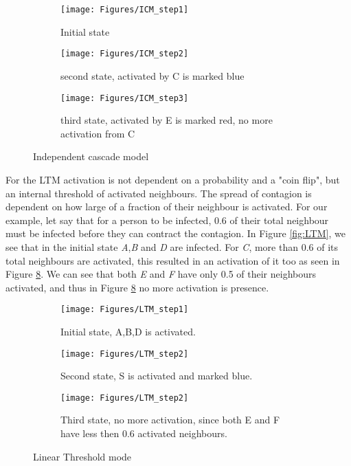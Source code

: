 
\begin{figure}[!ht]
    \begin{subfigure}{0.3\textwidth}
        \texttt{[image: Figures/ICM\_step1]}
        \caption{Initial state} 
        \label{fig:ICM1}
    \end{subfigure}
    \begin{subfigure}{0.3\textwidth}
        \texttt{[image: Figures/ICM\_step2]}
        \caption{second state, activated by C is marked blue} 
        \label{fig:ICM2}
    \end{subfigure}
    \begin{subfigure}{0.3\textwidth}
        \texttt{[image: Figures/ICM\_step3]}
        \caption{third state, activated by E is marked red, no more activation from C} 
        \label{fig:ICM3}
    \end{subfigure}
    \caption{Independent cascade model}
    \label{fig:ICM_step}
\end{figure}


For the LTM activation is not dependent on a probability and a "coin flip", but an internal threshold of activated neighbours. The spread of contagion is dependent on how large of a fraction of their neighbour is activated. For our example, let say that for a person to be infected, 0.6 of their total neighbour must be infected before they can contract the contagion. In Figure \ref{fig:LTM}, we see that in the initial state \textit{A},\textit{B} and \textit{D} are infected. For \textit{C}, more than 0.6 of its total neighbours are activated, this resulted in an activation of it too as seen in Figure \ref{fig:linearThresh3}.  We can see that both \textit{E} and \textit{F} have only 0.5 of their neighbours activated, and thus in Figure \ref{fig:linearThresh3} no more activation is presence.


\begin{figure}[!ht] \label{fig:LTM}
    \begin{subfigure}{0.3\textwidth}
        \texttt{[image: Figures/LTM\_step1]}
        \caption{Initial state, A,B,D is activated.} 
        \label{fig:linearThresh}
    \end{subfigure}
    \begin{subfigure}{0.3\textwidth}
        \texttt{[image: Figures/LTM\_step2]}
        \caption{Second state, S is activated and marked blue.} 
        \label{fig:linearThresh2}
    \end{subfigure}
    \begin{subfigure}{0.3\textwidth}
        \texttt{[image: Figures/LTM\_step2]}
        \caption{Third state, no more activation, since both E and F have less then 0.6 activated neighbours.} 
        \label{fig:linearThresh3}
    \end{subfigure}
    \caption{Linear Threshold mode}
\end{figure}



